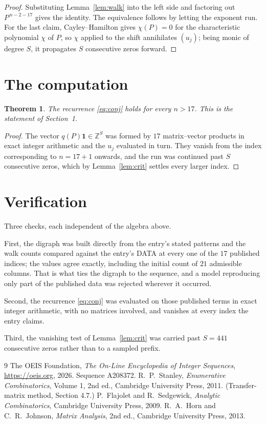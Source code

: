 \documentclass[11pt,a4paper]{article}
\theoremstyle{plain}
\newtheorem{theorem}{Theorem}
\theoremstyle{definition}
\begin{document}
\begin{proof}
Substituting Lemma~\ref{lem:walk} into the left side and factoring out
$P^{\,n-2-17}$ gives the identity. The equivalence follows by letting the exponent
run. For the last claim, Cayley--Hamilton gives $\chi(P)=0$ for the characteristic
polynomial $\chi$ of $P$, so $\chi$ applied to the shift annihilates $(u_j)$; being monic of
degree $S$, it propagates $S$ consecutive zeros forward.
\end{proof}

\section{The computation}

\begin{theorem}
The recurrence \eqref{eq:conj} holds for every $n>17$. This is the statement of
Section~1.
\end{theorem}

\begin{proof}
The vector $q(P)\mathbf{1}\in\mathbb{Z}^{S}$ was formed by $17$ matrix--vector
products in exact integer arithmetic and the $u_j$ evaluated in turn. They vanish from the
index corresponding to $n=17+1$ onwards, and the run was continued past $S$ consecutive
zeros, which by Lemma~\ref{lem:crit} settles every larger index.
\end{proof}

\section{Verification}

Three checks, each independent of the algebra above.

First, the digraph was built directly from the entry's stated patterns and the walk counts
compared against the entry's DATA at every one of the $17$ published indices; the
values agree exactly, including the initial count of $21$ admissible columns. That is
what ties the digraph to the sequence, and a model reproducing only part of the published
data was rejected wherever it occurred.

Second, the recurrence \eqref{eq:conj} was evaluated on those published terms in exact
integer arithmetic, with no matrices involved, and vanishes at every index the entry claims.

Third, the vanishing test of Lemma~\ref{lem:crit} was carried past $S=441$ consecutive
zeros rather than to a sampled prefix.

\begin{thebibliography}{9}
 The OEIS Foundation, \emph{The On-Line Encyclopedia of Integer
Sequences}, \url{https://oeis.org}, 2026. Sequence A208372.
 R.~P.~Stanley, \emph{Enumerative Combinatorics}, Volume 1, 2nd ed.,
Cambridge University Press, 2011. (Transfer-matrix method, Section 4.7.)
 P.~Flajolet and R.~Sedgewick, \emph{Analytic Combinatorics}, Cambridge
University Press, 2009.
 R.~A.~Horn and C.~R.~Johnson, \emph{Matrix Analysis}, 2nd ed., Cambridge
University Press, 2013.
\end{thebibliography}
\end{document}
